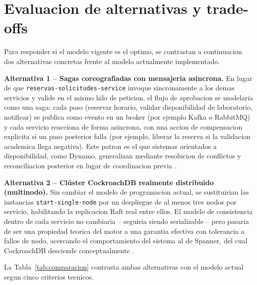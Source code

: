 \documentclass[11pt,a4paper]{article}
\begin{document}
\section{Evaluacion de alternativas y trade-offs}

Para responder si el modelo vigente es el optimo, se contrastan a continuacion dos alternativas concretas frente al modelo actualmente implementado.

\textbf{Alternativa 1 -- Sagas coreografiadas con mensajeria asincrona.} En lugar de que \texttt{reservas-solicitudes-service} invoque sincronamente a los demas servicios y valide en el mismo hilo de peticion, el flujo de aprobacion se modelaria como una saga: cada paso (reservar horario, validar disponibilidad de laboratorio, notificar) se publica como evento en un broker (por ejemplo Kafka o RabbitMQ) y cada servicio reacciona de forma asincrona, con una accion de compensacion explicita si un paso posterior falla (por ejemplo, liberar la reserva si la validacion academica llega negativa). Este patron es el que sistemas orientados a disponibilidad, como Dynamo, generalizan mediante resolucion de conflictos y reconciliacion posterior en lugar de coordinacion previa \cite{decandia2007}.

\textbf{Alternativa 2 -- Clúster CockroachDB realmente distribuido (multinodo).} Sin cambiar el modelo de programacion actual, se sustituirian las instancias \texttt{start-single-node} por un despliegue de al menos tres nodos por servicio, habilitando la replicacion Raft real entre ellos. El modelo de consistencia dentro de cada servicio no cambiaria -- seguiria siendo serializable -- pero pasaria de ser una propiedad teorica del motor a una garantia efectiva con tolerancia a fallos de nodo, acercando el comportamiento del sistema al de Spanner, del cual CockroachDB desciende conceptualmente \cite{corbett2013}.

La Tabla~\ref{tab:comparacion} contrasta ambas alternativas con el modelo actual segun cinco criterios tecnicos.
\end{document}
